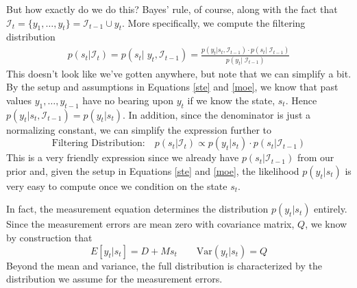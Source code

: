 \documentclass[a4paper,12pt]{article}
\begin{document}
But how exactly do we do this? Bayes' rule, of course, along with the fact that $\mathcal{I}_{t} = \{y_1, \ldots, y_t\}=\mathcal{I}_{t-1} \cup y_t$. More specifically, we compute the filtering distribution 
\begin{align*}
  p(s_t | \mathcal{I}_{t}) = 
  p(s_t | \; y_t, \mathcal{I}_{t-1}) = 
  \frac{
    p(y_t | s_t, \mathcal{I}_{t-1}) 
    \cdot p(s_t|\; \mathcal{I}_{t-1})
  }{p(y_t | \; \mathcal{I}_{t-1})}
\end{align*}
This doesn't look like we've gotten anywhere, but note that we can simplify a bit. By the setup and assumptions in Equations \ref{ste} and \ref{moe}, we know that past values $y_1, \ldots, y_{t-1}$ have no bearing upon $y_t$ if we know the state, $s_t$. Hence $p(y_t|s_t, \mathcal{I}_{t-1}) = p(y_t|s_t)$. In addition, since the denominator is just a normalizing constant, we can simplify the expression further to  
\begin{equation}
  \label{filt}
  \text{Filtering Distribution:} \quad
  p(s_t | \mathcal{I}_{t}) \propto p(y_t | s_t) \cdot 
  p(s_t |\mathcal{I}_{t-1})
\end{equation}
This is a very friendly expression since we already have $p(s_t | \mathcal{I}_{t-1})$ from our prior and, given the setup in Equations \ref{ste} and \ref{moe}, the likelihood $p(y_t|s_t)$ is very easy to compute once we condition on the state $s_t$.

In fact, the measurement equation determines the distribution $p(y_t|s_t)$ entirely. Since the measurement errors are mean zero with covariance matrix, $Q$, we know by construction that
\[
  E[y_t|s_t] = D + M s_t 
  \qquad 
  \text{Var}(y_t|s_t) = Q
\]
Beyond the mean and variance, the full distribution is characterized by the distribution we assume for the measurement errors.
\end{document}
